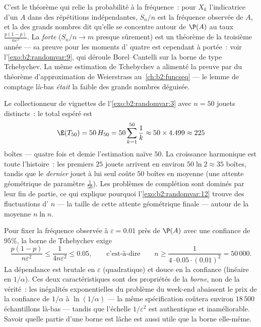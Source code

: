 \begin{remark}
C'est le théorème qui relie la probabilité à la fréquence~: pour
$X_k$ l'indicatrice d'un  $A$ dans des répétitions indépendantes,
$S_n/n$ est la fréquence observée de $A$, et la  des grands
nombres dit qu'elle se concentre autour de $\P(A)$ au taux
$\frac{p(1-p)}{n\varepsilon^2}$. La  \emph{forte} ($S_n/n \to
m$ presque sûrement) est un théorème de la troisième année --- sa preuve pour les
moments d' quatre est cependant à portée~: voir l'\cref{exo:b2:randomvar:9},
qui déroule Borel--Cantelli sur la borne de type Tchebychev. La même
estimation de Tchebychev a alimenté la preuve par  du
théorème d'approximation de Weierstrass au~\cref{ch:b2:funcseq} --- le
lemme de comptage là-bas \emph{était} la  faible des grands nombres
déguisée.
\end{remark}

\begin{example}
\label{ex:b2:randomvar:couponnumeric}
Le collectionneur de vignettes de l'\cref{exo:b2:randomvar:3} avec $n =
50$ jouets distincts~: le total espéré est
\[
\E(T_{50}) = 50\,H_{50} = 50\sum_{k=1}^{50}\frac1k
\approx 50 \times 4.499 \approx 225
\]
boîtes --- quatre fois et demie l'estimation naïve $50$. La
croissance harmonique est toute l'histoire~: les premiers $25$ jouets
arrivent en environ $50\ln2 \approx 35$ boîtes, tandis que le
\emph{dernier} jouet à lui seul coûte $50$ boîtes en moyenne (une
attente géométrique de paramètre $\frac1{50}$). Les problèmes de
complétion sont dominés par leur fin de partie, ce qui explique
pourquoi l'\cref{exo:b2:randomvar:12} trouve des fluctuations d' $n$
--- la taille de cette attente géométrique finale --- autour de la
moyenne $n\ln n$.
\end{example}

\begin{example}\label{ex:b2:randomvar:llnnumeric}
Pour fixer la fréquence observée à $\varepsilon = 0.01$ près de
$\P(A)$ avec une confiance de $95\%$, la borne de Tchebychev exige
\[
\frac{p(1-p)}{n\varepsilon^2} \leq \frac{1}{4n\varepsilon^2}
\leq 0.05,
\qquad\text{c'est-à-dire}\qquad
n \geq \frac{1}{4\cdot0.05\cdot(0.01)^2} = 50\,000 .
\]
La dépendance est brutale en $\varepsilon$ (quadratique) et
douce en la confiance (linéaire en $1/\alpha$). Ces deux caractéristiques
sont des propriétés de la \emph{borne}, non de la vérité~: les
inégalités exponentielles du problème du week-end abaissent le prix de
la confiance de $1/\alpha$ à $\ln(1/\alpha)$ --- la même
spécification coûtera environ $18\,500$ échantillons là-bas ---
tandis que l'échelle $1/\varepsilon^2$ est authentique et
inaméliorable. Savoir quelle partie d'une borne est lâche est aussi
utile que la borne elle-même.
\end{example}

